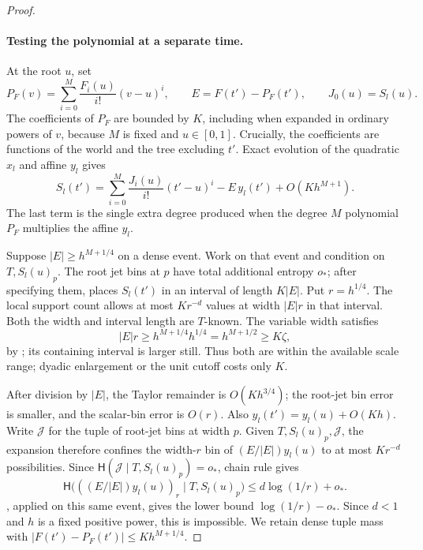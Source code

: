 \begin{proof}
\paragraph{Testing the polynomial at a separate time.}
At the root \(u\), set
\[
 P_F(v)=\sum_{i=0}^M\frac{F_i(u)}{i!}(v-u)^i,\qquad
 E=F(t')-P_F(t'),\qquad J_0(u)=S_l(u).
\]
The coefficients of \(P_F\) are bounded by \(K\), including when
expanded in ordinary powers of \(v\), because \(M\) is fixed and
\(u\in[0,1]\).
Crucially, the coefficients are functions of the world and the tree
excluding \(t'\).
Exact evolution of the quadratic \(x_l\) and affine \(y_l\) gives
\begin{equation}\label{a04:final-jet-expansion}
 S_l(t')
 =\sum_{i=0}^M\frac{J_i(u)}{i!}(t'-u)^i
       -E\,y_l(t')+O(Kh^{M+1}).
\end{equation}
The last term is the single extra degree produced when the degree
\(M\) polynomial \(P_F\) multiplies the affine \(y_l\).

Suppose \(|E|\ge h^{M+1/4}\) on a dense event.
Work on that event and condition on \(T,S_l(u)_p\).
The root jet bins at \(p\) have total additional entropy \(o_*\);
after specifying them,  places \(S_l(t')\)
in an interval of length \(K|E|\).
Put \(r=h^{1/4}\).
The local support count  allows at most
\(Kr^{-d}\) values at width \(|E|r\) in that interval.
Both the width and interval length are \(T\)-known.
The variable width satisfies
\[
 |E|r\ge h^{M+1/4}h^{1/4}=h^{M+1/2}\ge K\zeta,
\]
by ; its containing interval is larger still.
Thus both are within the available scale range;
dyadic enlargement or the unit cutoff costs only \(K\).

After division by \(|E|\), the Taylor remainder is \(O(Kh^{3/4})\);
the root-jet bin error is smaller, and the scalar-bin error is \(O(r)\).
Also \(y_l(t')=y_l(u)+O(Kh)\).
Write \(\mathcal J\) for the tuple of root-jet bins at width
\(p\).  Given \(T,S_l(u)_p,\mathcal J\), the expansion therefore
confines the width-\(r\) bin of \((E/|E|)y_l(u)\) to at most
\(Kr^{-d}\) possibilities.  Since
\(\mathsf H(\mathcal J\mid T,S_l(u)_p)=o_*\), chain rule gives
\[
 \mathsf H\bigl(((E/|E|)y_l(u))_r\mid T,S_l(u)_p\bigr)
 \le d\log(1/r)+o_*.
\]
, applied on this same event,
gives the lower bound \(\log(1/r)-o_*\).
Since \(d<1\) and \(h\) is a fixed positive power, this is impossible.
We retain dense tuple mass with
\(|F(t')-P_F(t')|\le Kh^{M+1/4}\).


\end{proof}
